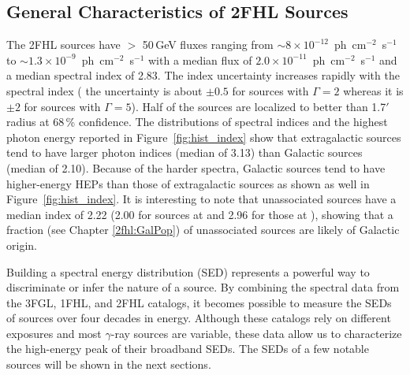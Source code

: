 {%


%
%
\subsection{General Characteristics of 2FHL Sources}\label{2fhl:General}

The 2FHL sources have $>$ 50\,GeV fluxes ranging from
$\sim$$8\times 10^{-12}$~ph~cm$^{-2}$~s$^{-1}$ to $\sim$$1.3\times 10^{-9}$~ph~cm$^{-2}$~s$^{-1}$
with a median flux of  $2.0\times 10^{-11}$~ph~cm$^{-2}$~s$^{-1}$
and a median spectral index of 2.83. The index uncertainty increases rapidly with the spectral index (\eg{} the uncertainty is about
$\pm 0.5$ for sources with $\Gamma=2$ whereas it is 
$\pm 2$ for sources with $\Gamma=5$).
Half of the sources are localized to better than
1.7$'$ radius at 68\,\% confidence. 
The distributions of spectral indices and the highest photon energy reported in Figure~\ref{fig:hist_index} show that extragalactic sources tend to have larger photon indices (median of 3.13) than Galactic sources (median of 2.10).   Because of the harder spectra, Galactic sources tend to have higher-energy HEPs than those of extragalactic sources
as shown as well in Figure~\ref{fig:hist_index}.
It is interesting to note that unassociated sources have a median index of 2.22 (2.00 for  sources at \blat and 2.96 for those at \blot), showing that a fraction (see Chapter \ref{2fhl:GalPop}) of unassociated sources are likely of Galactic origin. 

Building a spectral energy distribution (SED) represents a powerful way to discriminate or infer the nature of a source. By combining the spectral data from the 3FGL, 1FHL, and 2FHL catalogs, it becomes possible to measure the SEDs
of sources over four decades in energy. Although these catalogs rely on different exposures and  most $\gamma$-ray sources are variable, these data allow us to characterize the high-energy peak of their broadband SEDs. The SEDs of a few notable sources will be shown in the next sections.

}
